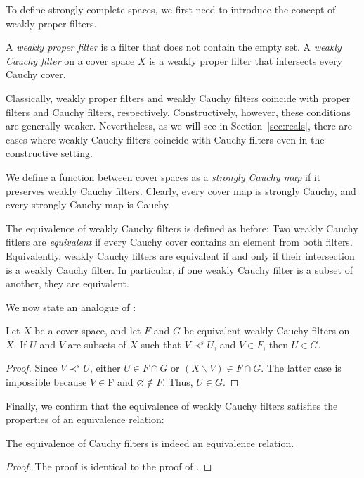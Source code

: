 \documentclass[pdflatex,sn-mathphys-num]{sn-jnl}
\theoremstyle{definition}
\theoremstyle{remark}
\numberwithin{figure}{section}
\newcommand{\rb}{\prec}
\begin{document}
To define strongly complete spaces, we first need to introduce the concept of weakly proper filters.

\begin{defn}
A \emph{weakly proper filter} is a filter that does not contain the empty set.
A \emph{weakly Cauchy filter} on a cover space $X$ is a weakly proper filter that intersects every Cauchy cover.
\end{defn}

\begin{remark}
Classically, weakly proper filters and weakly Cauchy filters coincide with proper filters and Cauchy filters, respectively.
Constructively, however, these conditions are generally weaker.
Nevertheless, as we will see in Section~\ref{sec:reals}, there are cases where weakly Cauchy filters coincide with Cauchy filters even in the constructive setting.
\end{remark}

We define a function between cover spaces as a \emph{strongly Cauchy map} if it preserves weakly Cauchy filters.
Clearly, every cover map is strongly Cauchy, and every strongly Cauchy map is Cauchy.

The equivalence of weakly Cauchy filters is defined as before:
Two weakly Cauchy fitlers are \emph{equivalent} if every Cauchy cover contains an element from both filters.
Equivalently, weakly Cauchy filters are equivalent if and only if their intersection is a weakly Cauchy filter.
In particular, if one weakly Cauchy filter is a subset of another, they are equivalent.

We now state an analogue of :

\begin{lem}
Let $X$ be a cover space, and let $F$ and $G$ be equivalent weakly Cauchy filters on $X$.
If $U$ and $V$ are subsets of $X$ such that $V \rb^s U$, and $V \in F$, then $U \in G$.
\end{lem}
\begin{proof}
Since $V \rb^s U$, either $U \in F \cap G$ or $(X \backslash V) \in F \cap G$.
The latter case is impossible because $V \in $F and $\varnothing \notin F$.
Thus, $U \in G$.
\end{proof}

Finally, we confirm that the equivalence of weakly Cauchy filters satisfies the properties of an equivalence relation:

\begin{prop}
The equivalence of Cauchy filters is indeed an equivalence relation.
\end{prop}
\begin{proof}
The proof is identical to the proof of .
\end{proof}
\end{document}
